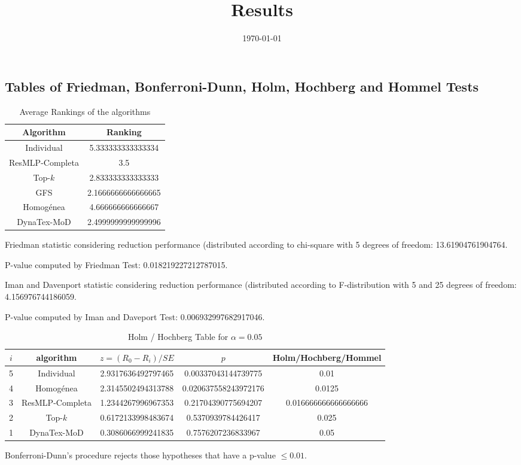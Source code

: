 \documentclass[a4paper,10pt]{article}
\title{Results}
\author{}
\date{\today}
\begin{document}
\begin{landscape}
\oddsidemargin 0in \topmargin 0in\maketitle
\section{Tables of Friedman, Bonferroni-Dunn, Holm, Hochberg and Hommel Tests}
\begin{table}[!htp]
\centering
\caption{Average Rankings of the algorithms
}\begin{tabular}{c|c}
Algorithm&Ranking\\
\hline
Individual&5.333333333333334\\
ResMLP-Completa&3.5\\
Top-$k$&2.833333333333333\\
GFS&2.1666666666666665\\
Homogénea&4.666666666666667\\
DynaTex-MoD&2.4999999999999996\\
\end{tabular}
\end{table}


Friedman statistic considering reduction performance (distributed according to chi-square with 5 degrees of freedom: 13.61904761904764.


P-value computed by Friedman Test: 0.018219227212787015.\newline

Iman and Davenport statistic considering reduction performance (distributed according to F-distribution with 5 and 25 degrees of freedom: 4.156976744186059.


P-value computed by Iman and Daveport Test: 0.006932997682917046.\newline

\begin{table}[!htp]
\centering\tiny
\caption{Holm / Hochberg Table for $\alpha=0.05$}
\begin{tabular}{ccccc}
$i$&algorithm&$z=(R_0 - R_i)/SE$&$p$&Holm/Hochberg/Hommel\\
\hline
5&Individual&2.9317636492797465&0.00337043144739775&0.01\\
4&Homogénea&2.3145502494313788&0.020637558243972176&0.0125\\
3&ResMLP-Completa&1.2344267996967353&0.21704390775694207&0.016666666666666666\\
2&Top-$k$&0.6172133998483674&0.5370939784426417&0.025\\
1&DynaTex-MoD&0.3086066999241835&0.7576207236833967&0.05\\
\hline
\end{tabular}
\end{table}
Bonferroni-Dunn's procedure rejects those hypotheses that have a p-value $\le0.01$.



\end{landscape}
\end{document}
